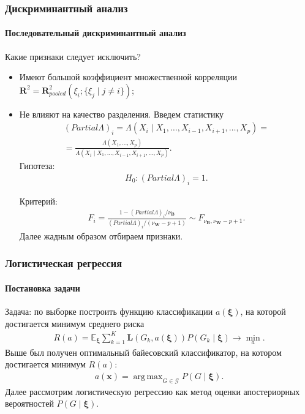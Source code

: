 \documentclass{beamer}
\DeclareMathOperator*{\argmax}{arg\,max}
\begin{document}
\begin{frame}
\frametitle{Дискриминантный анализ}
\framesubtitle{Последовательный дискриминантный анализ}
Какие признаки следует исключить?
  \begin{itemize}
    \item Имеют большой коэффициент множественной корреляции $\mathbf{R}^2 = \mathbf{R}^2_{pooled}(\xi_i;\{\xi_j \mid j \neq i\})$;
    \item Не влияют на качество разделения. Введем статистику
    \begin{multline*}
      (Partial \Lambda)_i = \Lambda(X_i \mid X_1, \ldots, X_{i - 1}, X_{i + 1}, \ldots, X_p) = \\
      = \frac{\Lambda(X_1, \ldots, X_p)}{\Lambda(X_i \mid X_1, \ldots, X_{i - 1}, X_{i + 1}, \ldots, X_p)}.
    \end{multline*}
    Гипотеза:
    \begin{align*}
      H_0 : (Partial \Lambda)_i = 1.
    \end{align*}

    Критерий:
    \begin{align*}
      F_i = \frac{1 - (Partial \Lambda)_i / \nu_\mathbf{B}}{(Partial \Lambda)_i/ (\nu_\mathbf{W} - p + 1)} \sim F_{\nu_\mathbf{B}, \nu_\mathbf{W} - p + 1}.
    \end{align*}
    Далее жадным образом отбираем признаки.
  \end{itemize}
\end{frame}
\begin{frame}
  \frametitle{Логистическая регрессия}
  \framesubtitle{Постановка задачи}
  Задача: по выборке построить функцию классификации $a(\boldsymbol{\xi})$, на которой достигается минимум среднего риска
  \begin{align*}
    R(a) = \mathds{E}_{\boldsymbol{\xi}} \sum_{k = 1}^{K} \mathbf{L}(G_k, a(\boldsymbol{\xi})) P(G_k \mid \boldsymbol{\xi}) \rightarrow \min_a.
  \end{align*}
 Выше был получен оптимальный байесовский классификатор, на котором достигается минимум $R(a)$:
  \begin{align*}
    a(\mathbf{x}) = \argmax_{G \in \mathcal{G}} P(G \mid \boldsymbol{\xi}).
  \end{align*}
Далее рассмотрим логистическую регрессию как метод оценки апостериорных вероятностей $P(G \mid \boldsymbol{\xi})$.
\end{frame}
\end{document}
